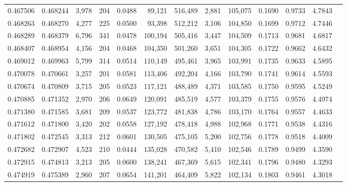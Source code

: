 \begin{tabular}{rrrrrrrrrrrrr}
0.467506 & 0.468244 &  3,978 &   204 &                                     0.0488 &  89,121 & 516,489 &   2,881 & 105,075 & 0.1690 & 0.9733 & 4.7843 \\
0.468263 & 0.468270 &  4,277 &   225 &                                     0.0500 &  93,398 & 512,212 &   3,106 & 104,850 & 0.1699 & 0.9712 & 4.7446 \\
0.468289 & 0.468379 &  6,796 &   341 &                                     0.0478 & 100,194 & 505,416 &   3,447 & 104,509 & 0.1713 & 0.9681 & 4.6817 \\
0.468407 & 0.468954 &  4,156 &   204 &                                     0.0468 & 104,350 & 501,260 &   3,651 & 104,305 & 0.1722 & 0.9662 & 4.6432 \\
0.469012 & 0.469963 &  5,799 &   314 &                                     0.0514 & 110,149 & 495,461 &   3,965 & 103,991 & 0.1735 & 0.9633 & 4.5895 \\
0.470078 & 0.470661 &  3,257 &   201 &                                     0.0581 & 113,406 & 492,204 &   4,166 & 103,790 & 0.1741 & 0.9614 & 4.5593 \\
0.470674 & 0.470809 &  3,715 &   205 &                                     0.0523 & 117,121 & 488,489 &   4,371 & 103,585 & 0.1750 & 0.9595 & 4.5249 \\
0.470885 & 0.471352 &  2,970 &   206 &                                     0.0649 & 120,091 & 485,519 &   4,577 & 103,379 & 0.1755 & 0.9576 & 4.4974 \\
0.471380 & 0.471585 &  3,681 &   209 &                                     0.0537 & 123,772 & 481,838 &   4,786 & 103,170 & 0.1764 & 0.9557 & 4.4633 \\
0.471612 & 0.471800 &  3,420 &   202 &                                     0.0558 & 127,192 & 478,418 &   4,988 & 102,968 & 0.1771 & 0.9538 & 4.4316 \\
0.471802 & 0.472545 &  3,313 &   212 &                                     0.0601 & 130,505 & 475,105 &   5,200 & 102,756 & 0.1778 & 0.9518 & 4.4009 \\
0.472682 & 0.472907 &  4,523 &   210 &                                     0.0444 & 135,028 & 470,582 &   5,410 & 102,546 & 0.1789 & 0.9499 & 4.3590 \\
0.472915 & 0.474813 &  3,213 &   205 &                                     0.0600 & 138,241 & 467,369 &   5,615 & 102,341 & 0.1796 & 0.9480 & 4.3293 \\
0.474919 & 0.475389 &  2,960 &   207 &                                     0.0654 & 141,201 & 464,409 &   5,822 & 102,134 & 0.1803 & 0.9461 & 4.3018 \\

\end{tabular}
